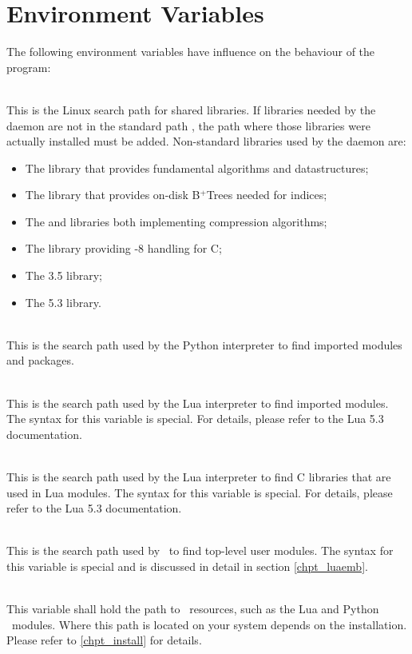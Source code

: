 \section{Environment Variables}
The following environment variables have influence
on the behaviour of the program:

\\
This is the Linux search path for shared libraries.
If libraries needed by the daemon are not in
the standard path , the path
where those libraries were actually installed
must be added.
Non-standard libraries used by the daemon are:
\begin{itemize}
\item The  library that provides
      fundamental algorithms and datastructures;
\item The  library that provides
      on-disk B$^+$Trees needed for indices;
\item The  and  libraries
      both implementing compression algorithms;
\item The  library providing -8
      handling for C;
\item The  3.5 library;
\item The  5.3 library.
\end{itemize}

\\
This is the search path used by the Python interpreter
to find imported modules and packages.

\\
This is the search path used by the Lua interpreter
to find imported modules.
The syntax for this variable is special.
For details, please refer to the Lua 5.3 documentation.

\\
This is the search path used by the Lua interpreter
to find C libraries that are used in Lua modules.
The syntax for this variable is special.
For details, please refer to the Lua 5.3 documentation.

\\
This is the search path used by \nowdb\ to find top-level
user modules. The syntax for this variable is special
and is discussed in detail in section \ref{chpt_luaemb}.

\\
This variable shall hold the path to \nowdb\ resources,
such as the Lua and Python \nowdb\ modules. Where this
path is located on your system depends on the installation.
Please refer to \ref{chpt_install} for details.

